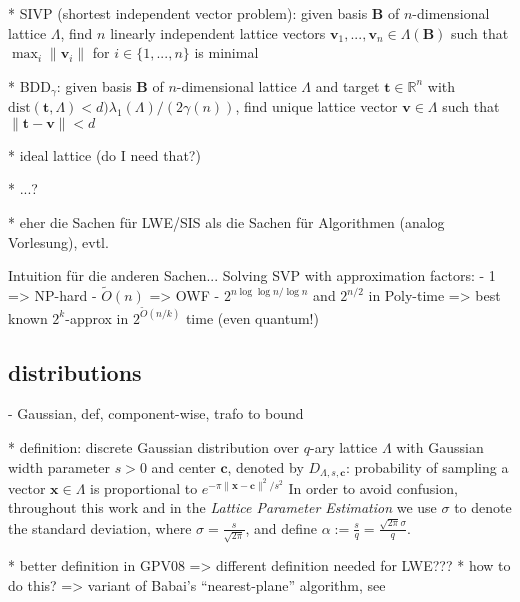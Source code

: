 \documentclass[
  a4paper,  %
  twoside,  %
  bibliography=totoc,
  headsepline,
  cleardoublepage=empty,
  parskip=half,
  draft=false
]{scrbook}
\begin{document}
  * \textsc{SIVP} (shortest independent vector problem): given  basis $\textbf{B}$ of $n$-dimensional lattice $\Lambda$, find $n$ linearly independent lattice vectors $\textbf{v}_1, ..., \textbf{v}_n \in \Lambda(\textbf{B})$ such that $\max_i \|\textbf{v}_i\|$ for $i \in \{1, ..., n\}$ is minimal

  * BDD$_\gamma$: given basis $\textbf{B}$ of $n$-dimensional lattice $\Lambda$ and target $\textbf{t}\in\mathbb{R}^n$ with $\text{dist}(\textbf{t}, \Lambda) < d ) \lambda_1(\Lambda)/(2\gamma(n))$, find unique lattice vector $\textbf{v} \in \Lambda$ such that $\|\textbf{t} - \textbf{v} \| < d$ %

  * ideal lattice (do I need that?)

  * ...?

  * eher die Sachen für LWE/SIS als die Sachen für Algorithmen (analog Vorlesung), evtl. 
  
  Intuition für die anderen Sachen...
  Solving SVP with approximation factors: %
        - 1 => NP-hard \cite{Ajt98}
        - $\tilde{O}(n)$ => OWF \cite{Ajt96, MR04}
        - $2^{n \log \log n / \log n}$ and $2^{n/2}$ in Poly-time \cite{LLL82}
        => best known $2^k$-approx in $2^{\tilde{O}(n/k)}$ time (even quantum!)


\subsection{distributions}

  - Gaussian, def, component-wise, trafo to bound %

    * definition:
      discrete Gaussian distribution over $q$-ary lattice $\Lambda$ with Gaussian width parameter $s > 0$ and center $\textbf{c}$, denoted by $D_{\Lambda, s, \textbf{c}}$: probability of sampling a vector $\textbf{x}\in \Lambda$ is proportional to $e^{-\pi \|\textbf{x} - \textbf{c}\|^2/s^2}$ %
      In order to avoid confusion, throughout this work and in the \textit{Lattice Parameter Estimation} we use $\sigma$ to denote the standard deviation, where $\sigma = \frac{s}{\sqrt{2 \pi}}$, and define $\alpha := \frac{s}{q} = \frac{\sqrt{2\pi} \sigma}{q}$. 

    * better definition in GPV08 => different definition needed for LWE??? %
    * how to do this? => variant of Babai's ``nearest-plane'' algorithm, see \cite{GPV08} %
\end{document}
